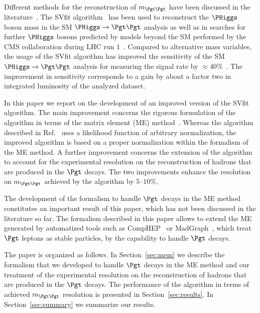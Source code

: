Different methods for the reconstruction of $m_{\Pgt\Pgt}$ 
have been discussed in the literature~\cite{massRecoCollinearApprox,neutrinoRecByVertexInfo,MMC,Barr:2011he,Gripaios:2012th}. 
The SVfit algorithm~\cite{SVfit} has been used to reconstruct the $\PHiggs$ boson mass in the SM $\PHiggs \to \Pgt\Pgt$ analysis
as well as in searches for further $\PHiggs$ bosons predicted by models beyond the SM 
performed by the CMS collaboration during LHC run $1$~\cite{HIG-10-002,HIG-11-029,HIG-13-004,HIG-13-021,HIG-14-029,HIG-14-033,HIG-15-001}.
Compared to alternative mass variables,
the usage of the SVfit algorithm has improved the sensitivity of the SM $\PHiggs \to \Pgt\Pgt$ analysis for measuring the signal rate by $\approx 40\%$~\cite{HIG-13-004}.
The improvement in sensitivity corresponds to a gain by about a factor two in integrated luminosity of the analyzed dataset.

In this paper we report on the development of an improved version of the SVfit algorithm.
The main improvement concerns the rigorous formulation of the algorithm in terms of the matrix element (ME) method~\cite{Kondo:1988yd,Kondo:1991dw}.
Whereas the algorithm described in Ref.~\cite{SVfit} uses a likelihood function of arbitrary normalization,
the improved algorithm is based on a proper normalization within the formalism of the ME method.
A further improvement concerns the extension of the algorithm to account for the experimental resolution 
on the reconstruction of hadrons that are produced in the $\Pgt$ decays.
The two improvements enhance the resolution on $m_{\Pgt\Pgt}$ achieved by the algorithm by $5$--$10\%$.

The development of the formalism to handle $\Pgt$ decays in the ME method constitutes an important result of this paper,
which has not been discussed in the literature so far.
The formalism described in this paper allows to extend the ME generated by automatized tools such as CompHEP~\cite{CompHEP1,CompHEP2} or MadGraph~\cite{MadGraph},
which treat $\Pgt$ leptons as stable particles, by the capability to handle $\Pgt$ decays.

The paper is organized as follows. 
In Section~\ref{sec:mem} we describe the formalism that we developed to handle $\Pgt$ decays in the ME method
and our treatment of the experimental resolution on the reconstruction of hadrons that are produced in the $\Pgt$ decays.
The performance of the algorithm in terms of achieved $m_{\Pgt\Pgt}$ resolution is presented in Section~\ref{sec:results}.
In Section~\ref{sec:summary} we summarize our results.
